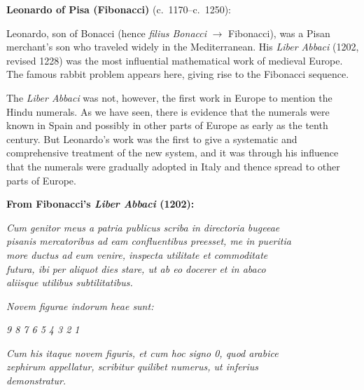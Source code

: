 \documentclass[11pt,a4paper]{article}
\newenvironment{latinpassage}{%
  \begin{tcolorbox}[colback=latinbg,colframe=rulecolor,boxrule=0.5pt,
    left=8pt,right=8pt,top=6pt,bottom=6pt,fontupper=\itshape]
}{\end{tcolorbox}}
\newenvironment{enhancednote}{%
  \begin{tcolorbox}[colback=enhancedbg,colframe=notecolor,boxrule=1pt,
    left=10pt,right=10pt,top=8pt,bottom=8pt,
    title={\textbf{Enhanced Edition Note}},fonttitle=\bfseries\color{notecolor}]
}{\end{tcolorbox}}
\begin{document}
\begin{enhancednote}
\textbf{Leonardo of Pisa (Fibonacci)} (c.~1170--c.~1250):

Leonardo, son of Bonacci (hence \textit{filius Bonacci} $\rightarrow$ Fibonacci), was a Pisan merchant's son who traveled widely in the Mediterranean. His \textit{Liber Abbaci} (1202, revised 1228) was the most influential mathematical work of medieval Europe. The famous rabbit problem appears here, giving rise to the Fibonacci sequence.
\end{enhancednote}

The \textit{Liber Abbaci} was not, however, the first work in Europe to mention the Hindu numerals. As we have seen, there is evidence that the numerals were known in Spain and possibly in other parts of Europe as early as the tenth century. But Leonardo's work was the first to give a systematic and comprehensive treatment of the new system, and it was through his influence that the numerals were gradually adopted in Italy and thence spread to other parts of Europe.

\begin{latinpassage}
\textbf{From Fibonacci's \textit{Liber Abbaci} (1202):}

\textit{Cum genitor meus a patria publicus scriba in directoria bugeeae}\\
\textit{pisanis mercatoribus ad eam confluentibus preesset, me in pueritia}\\
\textit{more ductus ad eum venire, inspecta utilitate et commoditate}\\
\textit{futura, ibi per aliquot dies stare, ut ab eo docerer et in abaco}\\
\textit{aliisque utilibus subtilitatibus.}

\vspace{0.5em}
\textit{Novem figurae indorum heae sunt:}

\textit{9 8 7 6 5 4 3 2 1}

\textit{Cum his itaque novem figuris, et cum hoc signo 0, quod arabice}\\
\textit{zephirum appellatur, scribitur quilibet numerus, ut inferius}\\
\textit{demonstratur.}
\end{latinpassage}
\end{document}
